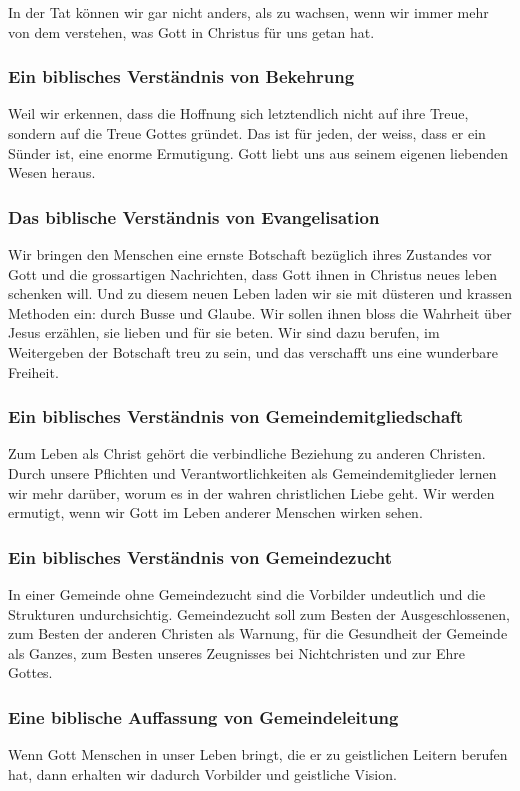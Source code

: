\documentclass{../../inc/mybib}
\begin{document}
In der Tat können wir gar nicht anders, als zu wachsen, wenn wir immer mehr von dem verstehen, was Gott in Christus für uns getan hat.
\subsubsection{Ein biblisches Verständnis von Bekehrung}
Weil wir erkennen, dass die Hoffnung sich letztendlich nicht auf ihre Treue, sondern auf die Treue Gottes gründet. Das ist für jeden, der weiss, dass er ein Sünder ist, eine enorme Ermutigung. Gott liebt uns aus seinem eigenen liebenden Wesen heraus.
\subsubsection{Das biblische Verständnis von Evangelisation}
Wir bringen den Menschen eine ernste Botschaft bezüglich ihres Zustandes vor Gott und die grossartigen Nachrichten, dass Gott ihnen in Christus neues leben schenken will. Und zu diesem neuen Leben laden wir sie mit düsteren und krassen Methoden ein: durch Busse und Glaube. Wir sollen ihnen bloss die Wahrheit über Jesus erzählen, sie lieben und für sie beten. Wir sind dazu berufen, im Weitergeben der Botschaft treu zu sein, und das verschafft uns eine wunderbare Freiheit.
\subsubsection{Ein biblisches Verständnis von Gemeindemitgliedschaft}
Zum Leben als Christ gehört die verbindliche Beziehung zu anderen Christen. Durch unsere Pflichten und Verantwortlichkeiten als Gemeindemitglieder lernen wir mehr darüber, worum es in der wahren christlichen Liebe geht. Wir werden ermutigt, wenn wir Gott im Leben anderer Menschen wirken sehen.
\subsubsection{Ein biblisches Verständnis von Gemeindezucht}
In einer Gemeinde ohne Gemeindezucht sind die Vorbilder undeutlich und die Strukturen undurchsichtig. Gemeindezucht soll zum Besten der Ausgeschlossenen, zum Besten der anderen Christen als Warnung, für die Gesundheit der Gemeinde als Ganzes, zum Besten unseres Zeugnisses bei Nichtchristen und zur Ehre Gottes.
\subsubsection{Eine biblische Auffassung von Gemeindeleitung}
Wenn Gott Menschen in unser Leben bringt, die er zu geistlichen Leitern berufen hat, dann erhalten wir dadurch Vorbilder und geistliche Vision.
\end{document}
